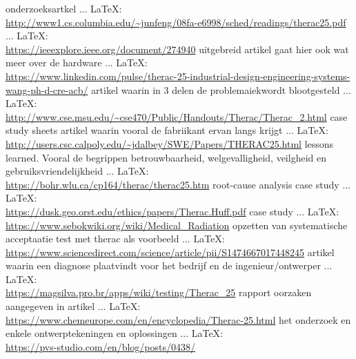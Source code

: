 \begin{thebibliography}{99}
{{{{				onderzoeksartkel
				 ... \LaTeX:\\ \url{http://www1.cs.columbia.edu/~junfeng/08fa-e6998/sched/readings/therac25.pdf}
				 ... \LaTeX:\\ \url{https://ieeexplore.ieee.org/document/274940}
				uitgebreid artikel gaat hier ook wat meer over de hardware
				 ... \LaTeX:\\ \url{https://www.linkedin.com/pulse/therac-25-industrial-design-engineering-systems-wang-ph-d-cre-acb/}
				artikel waarin in 3 delen de problemaiekwordt blootgesteld
				 ... \LaTeX:\\ \url{http://www.cse.msu.edu/~cse470/Public/Handouts/Therac/Therac_2.html}
				case study sheets
				artikel waarin vooral de fabriikant ervan langs krijgt
				 ... \LaTeX:\\ \url{http://users.csc.calpoly.edu/~jdalbey/SWE/Papers/THERAC25.html}
				lessons learned. Vooral de begrippen betrouwbaarheid, welgevalligheid, veilgheid en gebruiksvriendelijkheid
				 ... \LaTeX:\\ \url{https://bohr.wlu.ca/cp164/therac/therac25.htm}
				root-cause analysis
				case study
				 ... \LaTeX:\\ \url{https://dusk.geo.orst.edu/ethics/papers/Therac.Huff.pdf}
				case study
				 ... \LaTeX:\\ \url{https://www.sebokwiki.org/wiki/Medical_Radiation}
				opzetten van systematische acceptaatie test met therac als voorbeeld
				 ... \LaTeX:\\ \url{https://www.sciencedirect.com/science/article/pii/S1474667017448245}
				artikel waarin een diagnose plaatvindt voor het bedrijf en de ingenieur/ontwerper
				 ... \LaTeX:\\ \url{https://magsilva.pro.br/apps/wiki/testing/Therac_25}
				rapport
				oorzaken aangegeven in artikel
				 ... \LaTeX:\\ \url{https://www.chemeurope.com/en/encyclopedia/Therac-25.html}
				het onderzoek en enkele ontwerptekeningen en oplossingen
				 ... \LaTeX:\\ \url{https://pvs-studio.com/en/blog/posts/0438/}
				
}}}}
\end{thebibliography}
